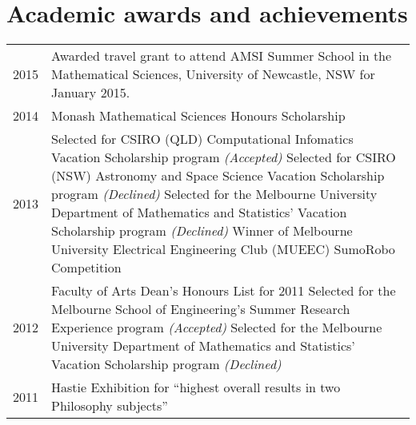 \documentclass[12pt,a4paper]{article}
\newenvironment{llist}
	{\renewcommand{\arraystretch}{1.5}\begin{longtable}{p{3.5cm} p{12cm}}}
	{\end{longtable}}
\begin{document}
\section*{Academic awards and achievements}

\begin{llist}
  2015 & Awarded travel grant to attend AMSI Summer School in the Mathematical
         Sciences, University of Newcastle, NSW for January 2015. \\
  2014 & Monash Mathematical Sciences Honours Scholarship \\
  2013 & Selected for CSIRO (QLD) Computational Infomatics Vacation Scholarship
         program \textit{(Accepted)} \newline \newline
         Selected for CSIRO (NSW) Astronomy and Space Science Vacation
         Scholarship program \textit{(Declined)}\newline \newline
         Selected for the Melbourne University Department of Mathematics and
         Statistics' Vacation Scholarship program \textit{(Declined)} \newline \newline
         Winner of Melbourne University Electrical Engineering Club (MUEEC)
         SumoRobo Competition \\
	2012 & Faculty of Arts Dean's Honours List for 2011 \newline \newline
         Selected for the Melbourne School of Engineering's Summer Research
         Experience program \textit{(Accepted)} \newline \newline
         Selected for the Melbourne University Department of Mathematics and
         Statistics' Vacation Scholarship program \textit{(Declined)} \\
	2011 & Hastie Exhibition for ``highest overall results in two Philosophy subjects''
\end{llist}
\end{document}
